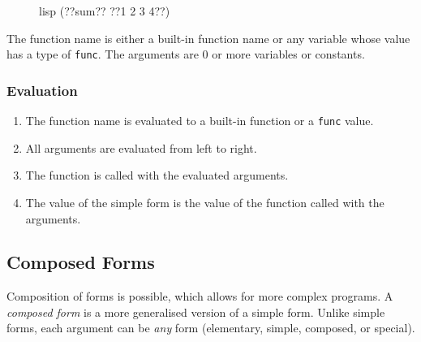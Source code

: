 \begin{figure}[htp]
    \centering
    \begin{cminted}[autogobble=true, escapeinside=??]{lisp}
        (??sum?? ??1 2 3 4??)
    \end{cminted}
    \captionsetup[figure]{font=small, skip=2em}
\end{figure}

The function name is either a built-in function name or any variable whose value has a type of \texttt{func}. The arguments are 0 or more variables or constants.

\subsubsection{Evaluation}
\begin{enumerate}
    \item The function name is evaluated to a built-in function or a \texttt{func} value.
    \item All arguments are evaluated from left to right.
    \item The function is called with the evaluated arguments.
    \item The value of the simple form is the value of the function called with the arguments.
\end{enumerate}

\subsection{Composed Forms} \label{subsec:composedforms}
Composition of forms is possible, which allows for more complex programs. A \textit{composed form} is a more generalised version of a simple form. Unlike simple forms, each argument can be \textit{any} form (elementary, simple, composed, or special).

